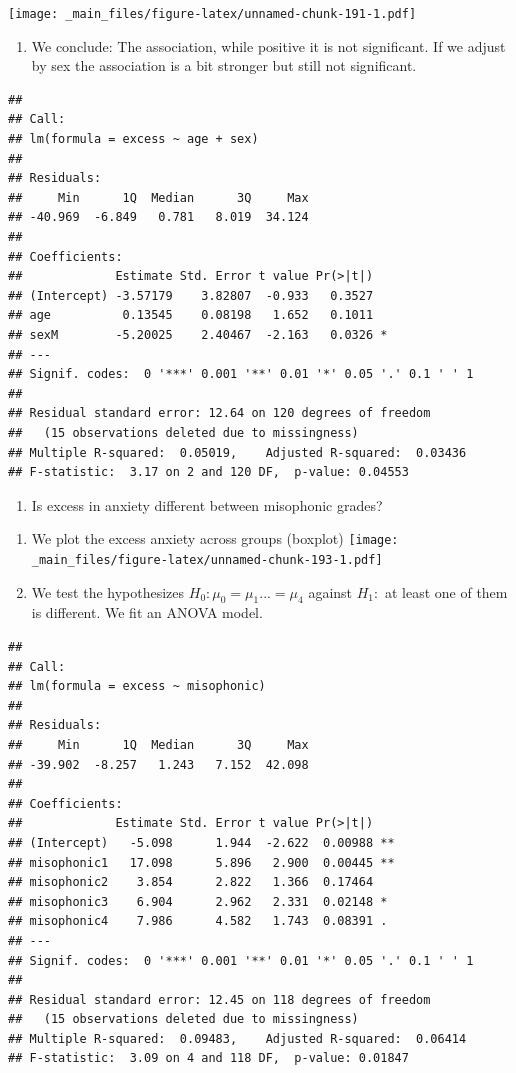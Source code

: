 \documentclass[
]{book}
\providecommand{\tightlist}{%
  \setlength{\itemsep}{0pt}\setlength{\parskip}{0pt}}
\begin{document}
\texttt{[image: \_main\_files/figure-latex/unnamed-chunk-191-1.pdf]}

\begin{enumerate}
\def\labelenumi{\alph{enumi}.}
\setcounter{enumi}{2}
\tightlist
\item
  We conclude: The association, while positive it is not significant. If we adjust by sex the association is a bit stronger but still not significant.
\end{enumerate}

\begin{verbatim}
## 
## Call:
## lm(formula = excess ~ age + sex)
## 
## Residuals:
##     Min      1Q  Median      3Q     Max 
## -40.969  -6.849   0.781   8.019  34.124 
## 
## Coefficients:
##             Estimate Std. Error t value Pr(>|t|)  
## (Intercept) -3.57179    3.82807  -0.933   0.3527  
## age          0.13545    0.08198   1.652   0.1011  
## sexM        -5.20025    2.40467  -2.163   0.0326 *
## ---
## Signif. codes:  0 '***' 0.001 '**' 0.01 '*' 0.05 '.' 0.1 ' ' 1
## 
## Residual standard error: 12.64 on 120 degrees of freedom
##   (15 observations deleted due to missingness)
## Multiple R-squared:  0.05019,    Adjusted R-squared:  0.03436 
## F-statistic:  3.17 on 2 and 120 DF,  p-value: 0.04553
\end{verbatim}

\begin{enumerate}
\def\labelenumi{\arabic{enumi}.}
\setcounter{enumi}{4}
\tightlist
\item
  Is excess in anxiety different between misophonic grades?
\end{enumerate}

\begin{enumerate}
\def\labelenumi{\alph{enumi}.}
\item
  We plot the excess anxiety across groups (boxplot)
  \texttt{[image: \_main\_files/figure-latex/unnamed-chunk-193-1.pdf]}
\item
  We test the hypothesizes \(H_0: \mu_{0}=\mu_{1} ... =\mu_{4}\) against \(H_1:\) at least one of them is different. We fit an ANOVA model.
\end{enumerate}

\begin{verbatim}
## 
## Call:
## lm(formula = excess ~ misophonic)
## 
## Residuals:
##     Min      1Q  Median      3Q     Max 
## -39.902  -8.257   1.243   7.152  42.098 
## 
## Coefficients:
##             Estimate Std. Error t value Pr(>|t|)   
## (Intercept)   -5.098      1.944  -2.622  0.00988 **
## misophonic1   17.098      5.896   2.900  0.00445 **
## misophonic2    3.854      2.822   1.366  0.17464   
## misophonic3    6.904      2.962   2.331  0.02148 * 
## misophonic4    7.986      4.582   1.743  0.08391 . 
## ---
## Signif. codes:  0 '***' 0.001 '**' 0.01 '*' 0.05 '.' 0.1 ' ' 1
## 
## Residual standard error: 12.45 on 118 degrees of freedom
##   (15 observations deleted due to missingness)
## Multiple R-squared:  0.09483,    Adjusted R-squared:  0.06414 
## F-statistic:  3.09 on 4 and 118 DF,  p-value: 0.01847
\end{verbatim}
\end{document}
